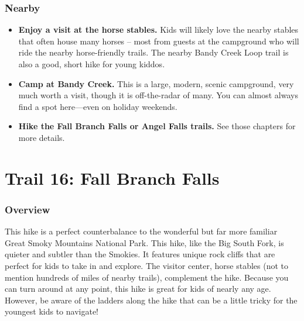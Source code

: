 \documentclass[
  letterpaper,
  DIV=11,
  numbers=noendperiod]{scrreprt}
\providecommand{\tightlist}{%
  \setlength{\itemsep}{0pt}\setlength{\parskip}{0pt}}\usepackage{longtable,booktabs,array}
\begin{document}
\subsection{Nearby}\label{nearby-14}

\begin{itemize}
\tightlist
\item
  \textbf{Enjoy a visit at the horse stables.} Kids will likely love the
  nearby stables that often house many horses -- most from guests at the
  campground who will ride the nearby horse-friendly trails. The nearby
  Bandy Creek Loop trail is also a good, short hike for young kiddos.
\item
  \textbf{Camp at Bandy Creek.} This is a large, modern, scenic
  campground, very much worth a visit, though it is off-the-radar of
  many. You can almost always find a spot here---even on holiday
  weekends.
\item
  \textbf{Hike the Fall Branch Falls or Angel Falls trails.} See those
  chapters for more details.
\end{itemize}

\chapter{Trail 16: Fall Branch Falls}\label{trail-16-fall-branch-falls}

\subsection{Overview}\label{overview-16}

This hike is a perfect counterbalance to the wonderful but far more
familiar Great Smoky Mountains National Park. This hike, like the Big
South Fork, is quieter and subtler than the Smokies. It features unique
rock cliffs that are perfect for kids to take in and explore. The
visitor center, horse stables (not to mention hundreds of miles of
nearby trails), complement the hike. Because you can turn around at any
point, this hike is great for kids of nearly any age. However, be aware
of the ladders along the hike that can be a little tricky for the
youngest kids to navigate!
\end{document}

